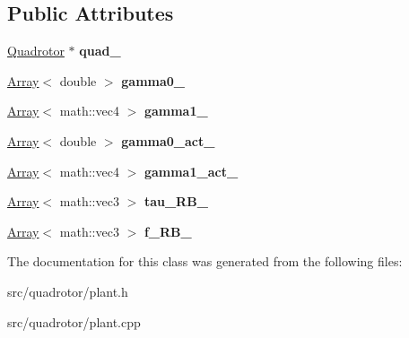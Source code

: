 \subsection*{Public Attributes}
\begin{DoxyCompactItemize}
\item 
\hypertarget{classPlant_ae068d79c30cca8feb18b3c71d9139568}{
\hyperlink{classQuadrotor}{Quadrotor} $\ast$ {\bfseries quad\_\-}}
\label{classPlant_ae068d79c30cca8feb18b3c71d9139568}

\item 
\hypertarget{classPlant_a51a7f6bb5a72b15923eaf338d88ae38b}{
\hyperlink{classArray}{Array}$<$ double $>$ {\bfseries gamma0\_\-}}
\label{classPlant_a51a7f6bb5a72b15923eaf338d88ae38b}

\item 
\hypertarget{classPlant_a4c085f84bc488811dcd9accb23cc3924}{
\hyperlink{classArray}{Array}$<$ math::vec4 $>$ {\bfseries gamma1\_\-}}
\label{classPlant_a4c085f84bc488811dcd9accb23cc3924}

\item 
\hypertarget{classPlant_a581118b2525e2cb4ef3fde8ad84448cd}{
\hyperlink{classArray}{Array}$<$ double $>$ {\bfseries gamma0\_\-act\_\-}}
\label{classPlant_a581118b2525e2cb4ef3fde8ad84448cd}

\item 
\hypertarget{classPlant_ad4029476cee0fce7bb7c2187cfc5ff64}{
\hyperlink{classArray}{Array}$<$ math::vec4 $>$ {\bfseries gamma1\_\-act\_\-}}
\label{classPlant_ad4029476cee0fce7bb7c2187cfc5ff64}

\item 
\hypertarget{classPlant_a9a8ccde306b87611c82ec5abd886429c}{
\hyperlink{classArray}{Array}$<$ math::vec3 $>$ {\bfseries tau\_\-RB\_\-}}
\label{classPlant_a9a8ccde306b87611c82ec5abd886429c}

\item 
\hypertarget{classPlant_ab7450e4bff3b3a1963f50ff4b8b39c6c}{
\hyperlink{classArray}{Array}$<$ math::vec3 $>$ {\bfseries f\_\-RB\_\-}}
\label{classPlant_ab7450e4bff3b3a1963f50ff4b8b39c6c}

\end{DoxyCompactItemize}


The documentation for this class was generated from the following files:\begin{DoxyCompactItemize}
\item 
src/quadrotor/plant.h\item 
src/quadrotor/plant.cpp\end{DoxyCompactItemize}
